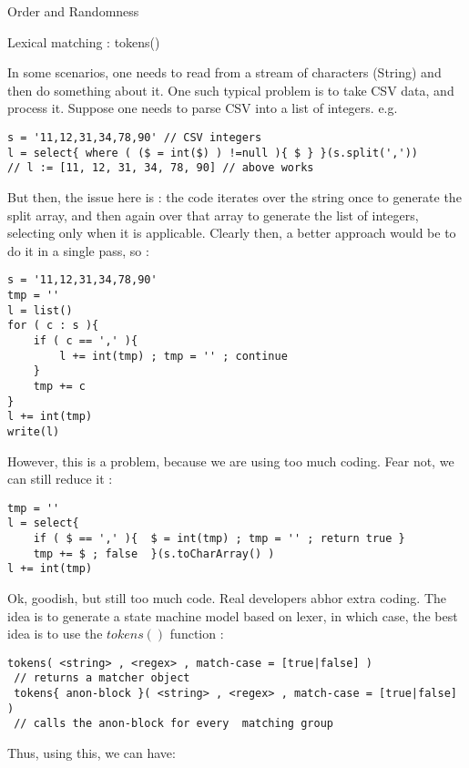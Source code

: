 \begin{section}{Order and Randomness}

\begin{subsection}{Lexical matching : tokens()}

In some scenarios, one needs to read from a stream of characters (String) and then do something about it.
One such typical problem is to take CSV data, and process it. Suppose one needs to parse CSV into a list of integers. e.g.

\begin{lstlisting}[style=JexlStyle]
s = '11,12,31,34,78,90' // CSV integers 
l = select{ where ( ($ = int($) ) !=null ){ $ } }(s.split(','))
// l := [11, 12, 31, 34, 78, 90] // above works
\end{lstlisting}  
But then, the issue here is : the code iterates over the string once to generate the split array, 
and then again over that array to generate the list of integers, selecting only when it is applicable.
Clearly then, a better approach would be to do it in a single pass, so :

\begin{lstlisting}[style=JexlStyle]
s = '11,12,31,34,78,90'
tmp = ''
l = list()
for ( c : s ){
    if ( c == ',' ){
        l += int(tmp) ; tmp = '' ; continue 
    }
    tmp += c
}
l += int(tmp) 
write(l)
\end{lstlisting}  
 
However, this is a problem, because we are using too much coding. 
Fear not, we can still reduce it :

\begin{lstlisting}[style=JexlStyle]
tmp = ''
l = select{ 
    if ( $ == ',' ){  $ = int(tmp) ; tmp = '' ; return true } 
    tmp += $ ; false  }(s.toCharArray() )
l += int(tmp) 
\end{lstlisting}  
  
Ok, goodish, but still too much code. Real developers abhor extra coding. 
The idea is to generate a state machine model based on lexer, in which case, 
the best idea is to use the $tokens()$ function :  

\begin{lstlisting}[style=JexlStyle]
tokens( <string> , <regex> , match-case = [true|false] ) 
 // returns a matcher object 
 tokens{ anon-block }( <string> , <regex> , match-case = [true|false] ) 
 // calls the anon-block for every  matching group  
\end{lstlisting}  
  
Thus, using this, we can have:  
  

\end{subsection}
\end{section}
